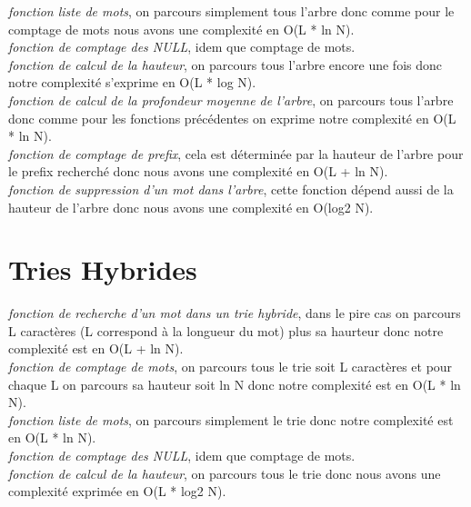 \documentclass[a4paper,8pt]{report}
\begin{document}
\smallskip
\textit{fonction liste de mots}, on parcours simplement tous l'arbre donc comme pour le comptage de mots nous avons une complexit\'e en O(L * ln N).\\

\smallskip
\textit{fonction de comptage des NULL}, idem que comptage de mots.\\

\smallskip
\textit{fonction de calcul de la hauteur}, on parcours tous l'arbre encore une fois donc notre complexit\'e s'exprime en O(L * log N).\\

\smallskip
\textit{fonction de calcul de la profondeur moyenne de l'arbre}, on parcours tous l'arbre donc comme pour les fonctions pr\'ec\'edentes on exprime notre complexit\'e en O(L * ln N).\\

\smallskip
\textit{fonction de comptage de prefix}, cela est d\'etermin\'ee par la hauteur de l'arbre pour le prefix recherch\'e donc nous avons une complexit\'e en O(L + ln N).\\

\smallskip
\textit{fonction de suppression d'un mot dans l'arbre}, cette fonction d\'epend aussi de la hauteur de l'arbre donc nous avons une complexit\'e en O(log2 N).\\

\section*{Tries Hybrides}\label{sec:name}

\textit{fonction de recherche d'un mot dans un trie hybride}, dans le pire cas on parcours L caract\`eres (L correspond \`a la longueur du mot) plus sa haurteur donc notre complexit\'e est en O(L + ln N).\\

\smallskip
\textit{fonction de comptage de mots}, on parcours tous le trie soit L caract\`eres et pour chaque L on parcours sa hauteur soit ln N donc notre complexit\'e est en O(L * ln N).\\

\smallskip
\textit{fonction liste de mots}, on parcours simplement le trie donc notre complexit\'e est en O(L * ln N).\\

\smallskip
\textit{fonction de comptage des NULL}, idem que comptage de mots.\\

\smallskip
\textit{fonction de calcul de la hauteur}, on parcours tous le trie donc nous avons une complexit\'e exprim\'ee en O(L * log2 N).\\
\end{document}

